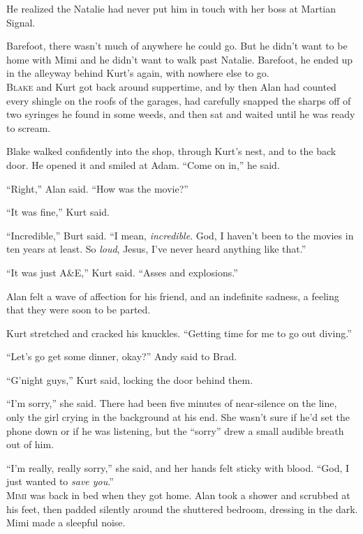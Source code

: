 \documentclass{article}
\begin{document}
He realized the Natalie had never put him in touch with her boss at
Martian Signal. 

Barefoot, there wasn't much of anywhere he could go.  But he didn't
want to be home with Mimi and he didn't want to walk past Natalie. 
Barefoot, he ended up in the alleyway behind Kurt's again, with
nowhere else to go.
\\
\lettrine[lines=3, lhang=.5, nindent=0pt, findent=2pt]{B}{lake} and Kurt got back around suppertime, and by then Alan had
counted every shingle on the roofs of the garages, had carefully
snapped the sharps off of two syringes he found in some weeds, and
then sat and waited until he was ready to scream.

Blake walked confidently into the shop, through Kurt's nest, and to
the back door.  He opened it and smiled at Adam.  ``Come on in,'' he
said.

``Right,'' Alan said.  ``How was the movie?''

``It was fine,'' Kurt said.

``Incredible,'' Burt said.  ``I mean, \textit{incredible}.  God, I
haven't been to the movies in ten years at least.  So \textit{loud},
Jesus, I've never heard anything like that.''

``It was just A\&E,'' Kurt said.  ``Asses and explosions.''

Alan felt a wave of affection for his friend, and an indefinite
sadness, a feeling that they were soon to be parted.

Kurt stretched and cracked his knuckles.  ``Getting time for me to go
out diving.''

``Let's go get some dinner, okay?'' Andy said to Brad.

``G'night guys,'' Kurt said, locking the door behind them.

``I'm sorry,'' she said.  There had been five minutes of near-silence
on the line, only the girl crying in the background at his end.  She
wasn't sure if he'd set the phone down or if he was listening, but the
``sorry'' drew a small audible breath out of him.

``I'm really, really sorry,'' she said, and her hands felt sticky with
blood.  ``God, I just wanted to \textit{save you}.''
\\
\lettrine[lines=3, lhang=.5, nindent=0pt, findent=2pt]{M}{imi} was back in bed when they got home.  Alan took a shower and
scrubbed at his feet, then padded silently around the shuttered
bedroom, dressing in the dark.  Mimi made a sleepful noise.
\end{document}
